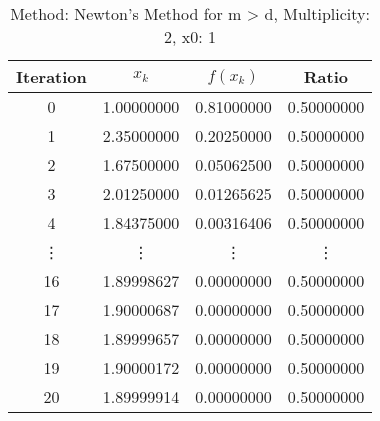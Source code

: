 \begin{table}
\centering
\caption{Method: Newton's Method for m > d, Multiplicity: 2, x0: 1}
\label{tab:table_Newton's_Method_for_m_>_d_2_1}
\begin{tabular}{c c c c}
\toprule
Iteration &      $x_k$ &   $f(x_k)$ &      Ratio \\
\midrule
        0 & 1.00000000 & 0.81000000 & 0.50000000 \\
        1 & 2.35000000 & 0.20250000 & 0.50000000 \\
        2 & 1.67500000 & 0.05062500 & 0.50000000 \\
        3 & 2.01250000 & 0.01265625 & 0.50000000 \\
        4 & 1.84375000 & 0.00316406 & 0.50000000 \\
   \vdots &     \vdots &     \vdots &     \vdots \\
       16 & 1.89998627 & 0.00000000 & 0.50000000 \\
       17 & 1.90000687 & 0.00000000 & 0.50000000 \\
       18 & 1.89999657 & 0.00000000 & 0.50000000 \\
       19 & 1.90000172 & 0.00000000 & 0.50000000 \\
       20 & 1.89999914 & 0.00000000 & 0.50000000 \\
\bottomrule
\end{tabular}
\end{table}
